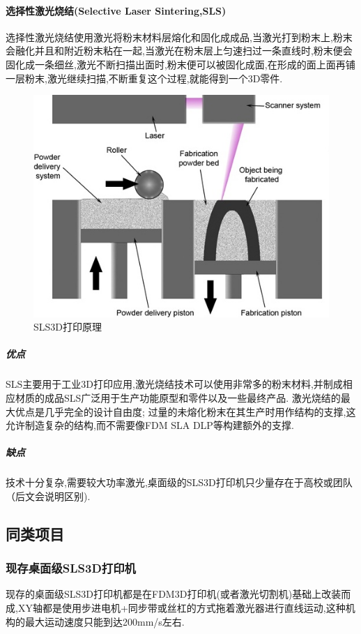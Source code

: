 \documentclass[a4paper,12pt,onecolumn,twoside]{article}
\begin{document}
\paragraph{选择性激光烧结(Selective Laser Sintering,SLS)}
选择性激光烧结使用激光将粉末材料层熔化和固化成成品,当激光打到粉末上,粉末会融化并且和附近粉末粘在一起,当激光在粉末层上匀速扫过一条直线时,粉末便会固化成一条细丝,激光不断扫描出面时,粉末便可以被固化成面,在形成的面上面再铺一层粉末,激光继续扫描,不断重复这个过程,就能得到一个3D零件.
\begin{figure}[htbp]
\centering     
\includegraphics[width=0.9\linewidth]{SLS0.jpg}
\caption{SLS3D打印原理}
\end{figure}
\subparagraph{优点}
SLS主要用于工业3D打印应用,激光烧结技术可以使用非常多的粉末材料,并制成相应材质的成品SLS广泛用于生产功能原型和零件以及一些最终产品. 激光烧结的最大优点是几乎完全的设计自由度; 过量的未熔化粉末在其生产时用作结构的支撑,这允许制造复杂的结构,而不需要像FDM SLA DLP等构建额外的支撑.
\subparagraph{缺点}
技术十分复杂,需要较大功率激光,桌面级的SLS3D打印机只少量存在于高校或团队（后文会说明区别).
\subsection{同类项目}
\subsubsection{现存桌面级SLS3D打印机}
现存的桌面级SLS3D打印机都是在FDM3D打印机(或者激光切割机)基础上改装而成,XY轴都是使用步进电机+同步带或丝杠的方式拖着激光器进行直线运动,这种机构的最大运动速度只能到达200mm/s左右.
\end{document}
